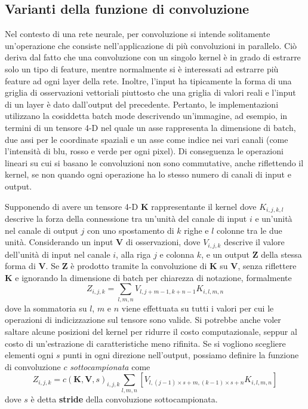 \documentclass[12pt,a4paper]{report}
\begin{document}
    \subsection{Varianti della funzione di convoluzione}
    Nel contesto di una rete neurale, per convoluzione si intende 
    solitamente un'operazione che consiste nell'applicazione di
    pi\`u convoluzioni in parallelo. Ci\`o deriva dal fatto che
    una convoluzione con un singolo kernel \`e in grado di estrarre
    solo un tipo di feature, mentre normalmente si \`e interessati 
    ad estrarre pi\`u feature ad ogni layer della rete. Inoltre,
    l'input ha tipicamente la forma di una griglia di osservazioni
    vettoriali piuttosto che una griglia di valori reali e l'input
    di un layer \`e dato dall'output del precedente. Pertanto, le
    implementazioni utilizzano la cosiddetta batch mode descrivendo
    un'immagine, ad esempio, in termini di un tensore 4-D nel quale
    un asse rappresenta la dimensione di batch, due assi per le
    coordinate spaziali e un asse come indice nei vari canali (come
    l'intensit\`a di blu, rosso e verde per ogni pixel). Di 
    conseguenza le operazioni lineari su cui si basano le 
    convoluzioni non sono commutative, anche riflettendo il kernel,
    se non quando ogni operazione ha lo stesso numero di canali di
    input e output.

    Supponendo di avere un tensore 4-D $\boldsymbol{K}$ 
    rappresentante il kernel dove $K_{i,j,k,l}$ descrive la forza 
    della connessione tra un'unit\`a del canale di input $i$ e 
    un'unit\`a nel canale di output $j$ con uno spostamento di $k$
    righe e $l$ colonne tra le due unit\`a. Considerando un input 
    $\boldsymbol{V}$ di osservazioni, dove $V_{i,j,k}$ descrive il 
    valore dell'unit\`a di input nel canale $i$, alla riga $j$ e 
    colonna $k$, e un output $\boldsymbol{Z}$ della stessa forma di
    $\boldsymbol{V}$. Se $\boldsymbol{Z}$ \`e prodotto tramite la 
    convoluzione di $\boldsymbol{K}$ su $\boldsymbol{V}$, senza 
    riflettere $\boldsymbol{K}$ e ignorando la dimensione di batch
    per chiarezza di notazione, formalmente
    \begin{equation} \label{eq:realconv}
        Z_{i,j,k} = \sum\limits_{l,m,n}V_{l,j+m-1,k+n-1}K_{i,l,m,n}
    \end{equation}
    dove la sommatoria su $l$, $m$ e $n$  viene effettuata su tutti
    i valori per cui le operazioni di indicizzazione sul tensore
    sono valide. Si potrebbe anche voler saltare alcune posizioni 
    del kernel per ridurre il costo computazionale, seppur al costo
    di un'estrazione di caratteristiche meno rifinita. Se si 
    vogliono scegliere elementi ogni $s$ punti in ogni direzione 
    nell'output, possiamo definire la funzione di convoluzione $c$ 
    \textit{sottocampionata} come
    \begin{equation} \label{eq:realconv2}
        Z_{i,j,k} = c(\boldsymbol{K}, \boldsymbol{V}, s)_{i,j,k}
        \sum\limits_{l,m,n}[V_{l,(j-1)\times s+m,(k-1)\times s+n}
        K_{i,l,m,n}]
    \end{equation}
    dove $s$ \`e detta \textbf{stride} della convoluzione 
    sottocampionata.
\end{document}
